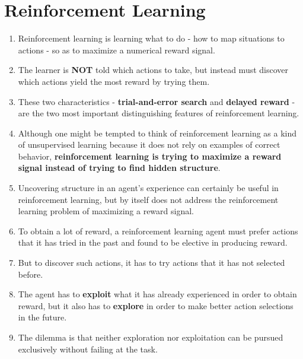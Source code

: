 \section{Reinforcement Learning \cite{drl-1}} \label{Reinforcement Learning}

\begin{enumerate}
    \item Reinforcement learning is learning what to do - how to map situations to actions - so as to maximize a numerical reward signal.

    \item The learner is \textbf{NOT} told which actions to take, but instead must discover which actions yield the most reward by trying them.

    \item These two characteristics - \textbf{trial-and-error search} and \textbf{delayed reward} - are the two most important distinguishing features of reinforcement learning.

    \item  Although one might be tempted to think of reinforcement learning as a kind of unsupervised learning because it does not rely on examples of correct behavior, \textbf{reinforcement learning is trying to maximize a reward signal instead of trying to find hidden structure}. 
    
    \item Uncovering structure in an agent’s experience can certainly be useful in reinforcement learning, but by itself does not address the reinforcement learning problem of maximizing a reward signal.

    \item  To obtain a lot of reward, a reinforcement learning agent must prefer actions that it has tried in the past and found to be elective in producing reward. 
    
    \item But to discover such actions, it has to try actions that it has not selected before. 
    
    \item The agent has to \textbf{exploit} what it has already experienced in order to obtain reward, but it also has to \textbf{explore} in order to make better action selections in the future. 
    
    \item The dilemma is that neither exploration nor exploitation can be pursued exclusively without failing at the task. 
    

\end{enumerate}
